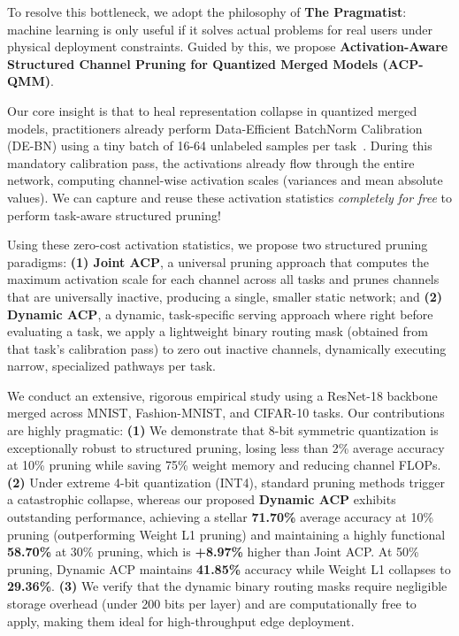 \documentclass{article}
\theoremstyle{plain}
\theoremstyle{definition}
\theoremstyle{remark}
\begin{document}
To resolve this bottleneck, we adopt the philosophy of \textbf{The Pragmatist}: machine learning is only useful if it solves actual problems for real users under physical deployment constraints. Guided by this, we propose \textbf{Activation-Aware Structured Channel Pruning for Quantized Merged Models (ACP-QMM)}. 

Our core insight is that to heal representation collapse in quantized merged models, practitioners already perform Data-Efficient BatchNorm Calibration (DE-BN) using a tiny batch of 16-64 unlabeled samples per task~\cite{anonymous2026b}. During this mandatory calibration pass, the activations already flow through the entire network, computing channel-wise activation scales (variances and mean absolute values). We can capture and reuse these activation statistics \textit{completely for free} to perform task-aware structured pruning!

Using these zero-cost activation statistics, we propose two structured pruning paradigms: \textbf{(1) Joint ACP}, a universal pruning approach that computes the maximum activation scale for each channel across all tasks and prunes channels that are universally inactive, producing a single, smaller static network; and \textbf{(2) Dynamic ACP}, a dynamic, task-specific serving approach where right before evaluating a task, we apply a lightweight binary routing mask (obtained from that task's calibration pass) to zero out inactive channels, dynamically executing narrow, specialized pathways per task.

We conduct an extensive, rigorous empirical study using a ResNet-18 backbone merged across MNIST, Fashion-MNIST, and CIFAR-10 tasks. Our contributions are highly pragmatic: \textbf{(1)} We demonstrate that 8-bit symmetric quantization is exceptionally robust to structured pruning, losing less than 2\% average accuracy at 10\% pruning while saving 75\% weight memory and reducing channel FLOPs. \textbf{(2)} Under extreme 4-bit quantization (INT4), standard pruning methods trigger a catastrophic collapse, whereas our proposed \textbf{Dynamic ACP} exhibits outstanding performance, achieving a stellar \textbf{71.70\%} average accuracy at 10\% pruning (outperforming Weight L1 pruning) and maintaining a highly functional \textbf{58.70\%} at 30\% pruning, which is \textbf{+8.97\%} higher than Joint ACP. At 50\% pruning, Dynamic ACP maintains \textbf{41.85\%} accuracy while Weight L1 collapses to \textbf{29.36\%}. \textbf{(3)} We verify that the dynamic binary routing masks require negligible storage overhead (under 200 bits per layer) and are computationally free to apply, making them ideal for high-throughput edge deployment.
\end{document}
